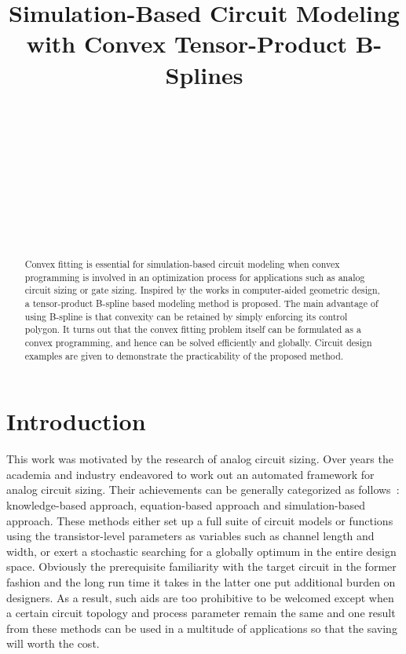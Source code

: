 \documentclass{sig-alternate}
\title{Simulation-Based Circuit Modeling with Convex Tensor-Product B-Splines
}
\author{\\ \\ \\ \\
\and
\\ \\ \\ \\
}
\begin{document}
\maketitle

\begin{abstract}
Convex fitting is essential for simulation-based circuit modeling
when convex programming is involved in an optimization process for 
applications such as analog circuit sizing or gate sizing. 
Inspired by the works in
computer-aided geometric design, a tensor-product B-spline based
modeling method is proposed. 
The main advantage of using B-spline is that convexity can
be retained by simply enforcing its control polygon. It turns out
that the convex fitting problem itself can be formulated as a convex
programming, and hence can be solved efficiently and globally.
Circuit design examples are given to demonstrate the
practicability of the proposed method.
\end{abstract}

\section{Introduction}
This work was motivated by the research of analog circuit sizing.
Over years the academia and industry endeavored to work out an
automated framework for analog circuit sizing. Their achievements
can be generally categorized as follows~\cite{Rutenbar_survey}:
knowledge-based approach, equation-based approach and
simulation-based approach. These methods either set up a full
suite of circuit models or functions using the transistor-level
parameters as variables such as channel length and width, or exert a
stochastic searching for a globally optimum in the entire design
space. Obviously the prerequisite familiarity with the target circuit
in the former fashion and the long run time it takes in the latter one put
additional burden on designers. As a result, such aids are too prohibitive to
be welcomed except when a certain circuit topology
and process parameter remain the same and one result from these
methods can be used in a multitude of applications so that the saving will
worth the cost.
\end{document}
